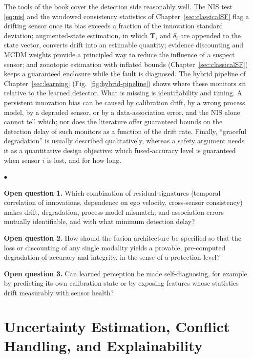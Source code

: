 \documentclass[graybox,envcountchap]{style/SNmono}
\newenvironment{list4a}{
  \begin{list}{$\bullet$}{
      \setlength{\itemsep}{0.05cm}
      \setlength{\labelsep}{0.2cm}
      \setlength{\labelwidth}{0.3cm}
      \setlength{\parsep}{0in}
      \setlength{\parskip}{0in}
      \setlength{\topsep}{0in}
      \setlength{\partopsep}{0in}
      \setlength{\leftmargin}{0.16in}}}
      {\end{list}}
\begin{document}
The tools of the book cover the detection side reasonably well. The NIS test \eqref{eq:nis} and the windowed consistency statistics of Chapter~\ref{sec:classicalSF} flag a drifting sensor once its bias exceeds a fraction of the innovation standard deviation; augmented-state estimation, in which $\mathbf{T}_i$ and $\delta_i$ are appended to the state vector, converts drift into an estimable quantity; evidence discounting and MCDM weights provide a principled way to reduce the influence of a suspect sensor; and zonotopic estimation with inflated bounds (Chapter~\ref{sec:classicalSF}) keeps a guaranteed enclosure while the fault is diagnosed. The hybrid pipeline of Chapter~\ref{sec:learning} (Fig.~\ref{fig:hybrid-pipeline}) shows where these monitors sit relative to the learned detector. What is missing is identifiability and timing. A persistent innovation bias can be caused by calibration drift, by a wrong process model, by a degraded sensor, or by a data-association error, and the NIS alone cannot tell which; nor does the literature offer guaranteed bounds on the detection delay of such monitors as a function of the drift rate. Finally, ``graceful degradation'' is usually described qualitatively, whereas a safety argument needs it as a quantitative design objective: which fused-accuracy level is guaranteed when sensor $i$ is lost, and for how long.

\begin{list4a}
    \item \textbf{Open question 1.} Which combination of residual signatures (temporal correlation of innovations, dependence on ego velocity, cross-sensor consistency) makes drift, degradation, process-model mismatch, and association errors mutually identifiable, and with what minimum detection delay?
    \item \textbf{Open question 2.} How should the fusion architecture be specified so that the loss or discounting of any single modality yields a provable, pre-computed degradation of accuracy and integrity, in the sense of a protection level?
    \item \textbf{Open question 3.} Can learned perception be made self-diagnosing, for example by predicting its own calibration state or by exposing features whose statistics drift measurably with sensor health?
\end{list4a}

\section{Uncertainty Estimation, Conflict Handling, and Explainability}
\label{subsec:oc-uncertainty}
\end{document}
